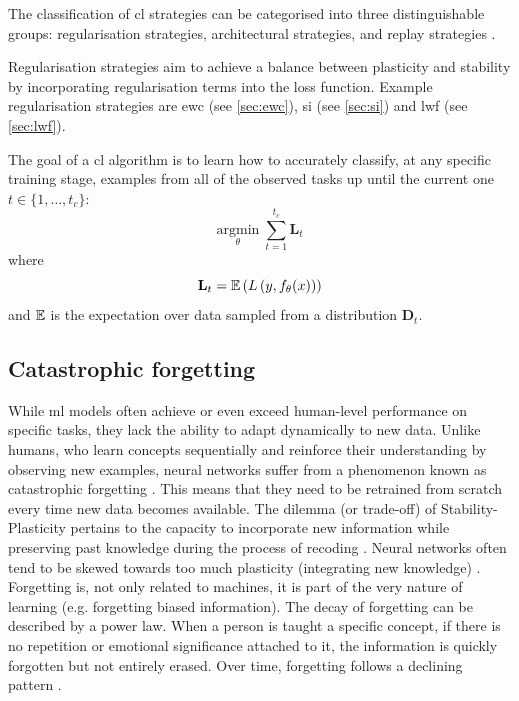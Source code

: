 The classification of \acrshort{cl} strategies can be categorised into three distinguishable groups: regularisation strategies, architectural strategies, and replay strategies \citep{parisi2019continual}. 

Regularisation strategies aim to achieve a balance between plasticity and stability by incorporating regularisation terms into the loss function. Example regularisation strategies are \acrshort{ewc} (see \ref{sec:ewc}), \acrshort{si} (see \ref{sec:si}) and \acrshort{lwf} (see \ref{sec:lwf}). 

The goal of a \acrshort{cl} algorithm is to learn how to accurately classify, at any specific training stage, examples from all of the observed tasks up until the current one $t\in \{ 1, \dots, t_{c} \}$:
\[
    \underset{\theta}{\mathrm{argmin}} \; \sum^{t_{c}}_{t=1} \mathbf{L}_{t}
\]
where
\[
    \mathbf{L}_{t} = \operatorname{\mathbb{E}} \left( L \left( y, f_{\theta} (x) \right) \right)
\]
and $\operatorname{\mathbb{E}}$ is the expectation over data sampled from a distribution $\mathbf{D}_t$. \\

\subsection{Catastrophic forgetting}
\label{ref:subsub_catastrophic}
While \acrshort{ml} models often achieve or even exceed human-level performance on specific tasks, they lack the ability to adapt dynamically to new data. Unlike humans, who learn concepts sequentially and reinforce their understanding by observing new examples, neural networks suffer from a phenomenon known as catastrophic forgetting \citep{french1999catastrophic}. This means that they need to be retrained from scratch every time new data becomes available. 
The dilemma (or trade-off) of Stability-Plasticity pertains to the capacity to incorporate new information while preserving past knowledge during the process of recoding \citep{grossberg2012studies}. Neural networks often tend to be skewed towards too much plasticity (integrating new knowledge) \citep{de2021continual}. Forgetting is, not only related to machines, it is part of the very nature of learning (e.g. forgetting biased information). The decay of forgetting can be described by a power law. When a person is taught a specific concept, if there is no repetition or emotional significance attached to it, the information is quickly forgotten but not entirely erased. Over time, forgetting follows a declining pattern \citep{pashler2009predicting}.


